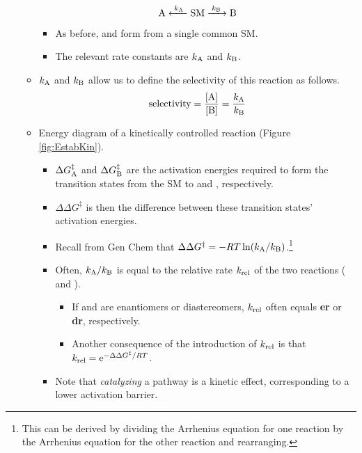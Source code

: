 \documentclass[../notes.tex]{subfiles}
\begin{document}
\begin{itemize}
\begin{itemize}
\begin{equation*}
            \ce{A <-[$k_{\ce{A}}$] SM ->[$k_{\ce{B}}$] B}
        \end{equation*}
        \begin{itemize}
            \item As before,  and  form from a single common SM.
            \item The relevant rate constants are $k_{\ce{A}}$ and $k_{\ce{B}}$.
        \end{itemize}
        \item $k_{\ce{A}}$ and $k_{\ce{B}}$ allow us to define the selectivity of this reaction as follows.
        \begin{equation*}
            \text{selectivity} = \frac{\cnc{A}}{\cnc{B}}
            = \frac{k_{\ce{A}}}{k_{\ce{B}}}
        \end{equation*}
        \item Energy diagram of a kinetically controlled reaction (Figure \ref{fig:EstabKin}).
        \begin{itemize}
            \item $\Delta G_{\ce{A}}^\ddagger$ and $\Delta G_{\ce{B}}^\ddagger$ are the activation energies required to form the transition states from the SM to  and , respectively.
            \item $\Delta\Delta G^\ddagger$ is then the difference between these transition states' activation energies.
            \item Recall from Gen Chem that $\Delta\Delta G^\ddagger=-RT\ln(k_{\ce{A}}/k_{\ce{B}})$.\footnote{This can be derived by dividing the Arrhenius equation for one reaction by the Arrhenius equation for the other reaction and rearranging.}
            \item Often, $k_{\ce{A}}/k_{\ce{B}}$ is equal to the relative rate $\krel$ of the two reactions ( and ).
            \begin{itemize}
                \item If  and  are enantiomers or diastereomers, $\krel$ often equals \textbf{er} or \textbf{dr}, respectively.
                \item Another consequence of the introduction of $\krel$ is that $\krel=\e[-\Delta\Delta G^\ddagger/RT]$.
            \end{itemize}
            \item Note that \emph{catalyzing} a pathway is a kinetic effect, corresponding to a lower activation barrier.
        \end{itemize}

\end{itemize}
\end{itemize}
\end{document}
